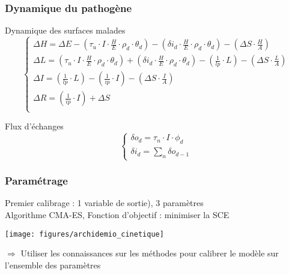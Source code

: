 \documentclass[10pt]{beamer}
\begin{document}
\begin{frame}
\frametitle{Dynamique du pathogène}

\begin{block}{Dynamique des surfaces malades}	
	\begin{equation*}
	\begin{cases}
	\Delta H = \Delta E 
	- \left ( \tau_u \cdot I \cdot \frac{H}{E} \cdot \rho_d \cdot \theta_d \right )  
	- \left ( \delta i_d \cdot \frac{H}{E} \cdot \rho_d \cdot \theta_d \right )
	- \left ( \Delta S \cdot \frac{H}{A} \right )\\
	
	\Delta L = 
	\left ( \tau_u \cdot I \cdot \frac{H}{E} \cdot \rho_d \cdot \theta_d \right )   
	+ \left ( \delta i_d \cdot \frac{H}{E} \cdot \rho_d \cdot \theta_d \right )
	- \left ( \frac{1}{lp} \cdot L \right )
	- \left ( \Delta S \cdot \frac{L}{A} \right )\\
	
	\Delta I =
	\left ( \frac{1}{lp} \cdot L \right ) 
	- \left ( \frac{1}{ip} \cdot I \right ) 
	- \left ( \Delta S \cdot \frac{I}{A} \right )\\
	
	\Delta R =
	\left ( \frac{1}{ip} \cdot I \right ) 
	+ \Delta S \\
	\end{cases}
	\end{equation*}
\end{block}

\begin{block}{Flux d'échanges}
	\begin{equation*}
	\begin{cases}
	\displaystyle \delta o_d = \tau_n \cdot I \cdot \phi_d \\
	\displaystyle \delta i_d = \sum_n \delta o_{d-1} 
	\end{cases}	
	\end{equation*}	
\end{block}

\end{frame}

\begin{frame}
\frametitle{Paramétrage}

Premier calibrage : 1 variable de sortie), 3 paramètres\\
Algorithme CMA-ES, Fonction d'objectif : minimiser la SCE

\begin{center}
	\texttt{[image: figures/archidemio\_cinetique]}
\end{center}
$\Rightarrow$ Utiliser les connaissances sur les méthodes pour calibrer le modèle sur l'ensemble des paramètres

\end{frame}
\end{document}
